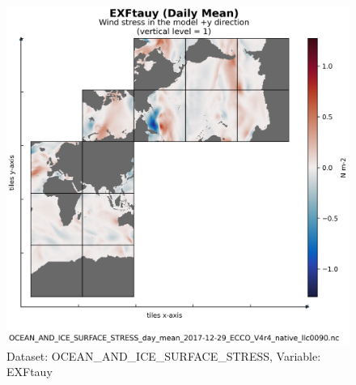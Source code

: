 
\begin{figure}[H]
\centering
\includegraphics[scale=0.55]{../images/plots/native_plots/Ocean_and_Sea-Ice_Surface_Stress/EXFtauy.png}
\caption{Dataset: OCEAN\_AND\_ICE\_SURFACE\_STRESS, Variable: EXFtauy}
\label{tab:table-OCEAN_AND_ICE_SURFACE_STRESS_EXFtauy-Plot}
\end{figure}
\newpage
\pagebreak
